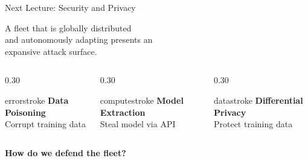 \documentclass[aspectratio=169, 12pt]{beamer}
\begin{document}
\begin{frame}{Next Lecture: Security and Privacy}

\centering
\vspace{0.8cm}
{\large A fleet that is globally distributed\\
and autonomously adapting presents an\\
\alert{expansive attack surface.}}

\vspace{0.6cm}
\begin{columns}[c]
  \begin{column}{0.30\textwidth}
    \centering
    \begin{mlsyscard}{errorstroke}
    {\small\bfseries Data Poisoning}\\[0.1cm]
    {\scriptsize Corrupt training data}
    \end{mlsyscard}
  \end{column}
  \begin{column}{0.30\textwidth}
    \centering
    \begin{mlsyscard}{computestroke}
    {\small\bfseries Model Extraction}\\[0.1cm]
    {\scriptsize Steal model via API}
    \end{mlsyscard}
  \end{column}
  \begin{column}{0.30\textwidth}
    \centering
    \begin{mlsyscard}{datastroke}
    {\small\bfseries Differential Privacy}\\[0.1cm]
    {\scriptsize Protect training data}
    \end{mlsyscard}
  \end{column}
\end{columns}

\vspace{0.4cm}
{\normalsize\textbf{How do we defend the fleet?}}

\end{frame}



\appendix
\end{document}
